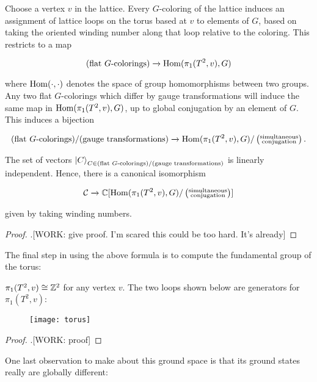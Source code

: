 \begin{proposition} Choose a vertex $v$ in the lattice. Every $G$-coloring of the lattice induces an assignment of lattice loops on the torus based at $v$ to elements of $G$, based on taking the oriented winding number along that loop relative to the coloring. This restricts to a map

$$(\text{flat $G$-colorings})\xrightarrow{}\operatorname{Hom}(\pi_1(T^2,v), G)$$

where $\operatorname{Hom}(\cdot,\cdot)$ denotes the space of group homomorphisms between two groups. Any two flat $G$-colorings which differ by gauge transformations will induce the same map in $\operatorname{Hom}(\pi_1(T^2,v), G)$, up to global conjugation by an element of $G$. This induces a bijection

$$(\text{flat $G$-colorings})/(\text{gauge transformations})\xrightarrow{}\operatorname{Hom}(\pi_1(T^2,v), G)/\left(\substack{\text{simultaneous} \\ \text{conjugation}}\right).$$

The set of vectors ${\ket{C}}_{C\in (\text{flat $G$-colorings})/(\text{gauge transformations})}$ is linearly independent. Hence, there is a canonical isomorphism

$$\mathcal{C} \xrightarrow{}\mathbb{C}[\operatorname{Hom}(\pi_1(T^2,v), G)/\left(\substack{\text{simultaneous} \\ \text{conjugation}}\right)]$$

given by taking winding numbers.
\end{proposition}
\begin{proof}.[WORK: give proof. I'm scared this could be too hard. It's already]
\end{proof}

The final step in using the above formula is to compute the fundamental group of the torus:

\begin{proposition} $\pi_1(T^2,v)\cong \mathbb{Z}^2$ for any vertex $v$. The two loops shown below are generators for $\pi_1(T^2,v)$:

\begin{figure}[h]
\begin{center}
\texttt{[image: torus]}
\end{center}
\end{figure}

\end{proposition}
\begin{proof}.[WORK: proof]
\end{proof}

One last observation to make about this ground space is that its ground states really are globally different:

